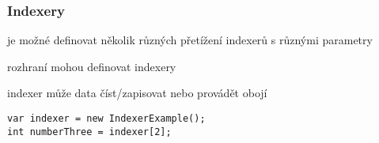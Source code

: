 \begin{frame}[fragile]
\frametitle{Indexery}
\vfill
\begin{bitemize}{}
\item je možné definovat několik různých přetížení indexerů s různými parametry
\item rozhraní mohou definovat indexery
\item indexer může data číst/zapisovat nebo provádět obojí
\end{bitemize}
\vfill
\begin{yesblock}
\begin{lstlisting}
var indexer = new IndexerExample();
int numberThree = indexer[2];
\end{lstlisting}
\end{yesblock}
\vfill
\end{frame}